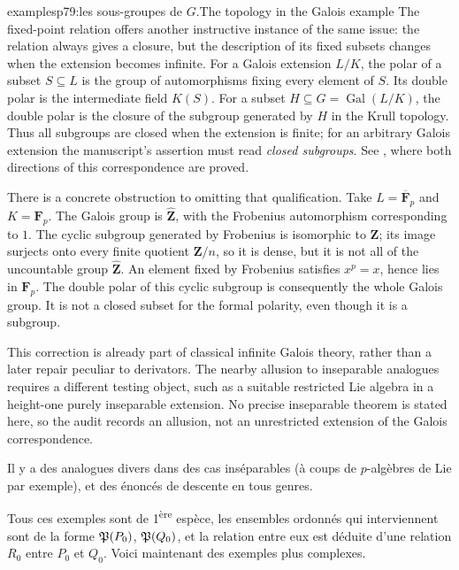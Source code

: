 \begin{dcomment}{examples}{p79:les sous-groupes de $G$.}{The topology in the Galois example}
The fixed-point relation offers another instructive instance of the same issue: the relation always gives a closure, but the description of its fixed subsets changes when the extension becomes infinite. For a Galois extension $L/K$, the polar of a subset $S\subseteq L$ is the group of automorphisms fixing every element of $S$. Its double polar is the intermediate field $K(S)$. For a subset $H\subseteq G=\operatorname{Gal}(L/K)$, the double polar is the closure of the subgroup generated by $H$ in the Krull topology. Thus all subgroups are closed when the extension is finite; for an arbitrary Galois extension the manuscript's assertion must read \emph{closed subgroups}. See \citet[Proposition 7.12 and Theorem 7.13]{Milne2022FT}, where both directions of this correspondence are proved.

There is a concrete obstruction to omitting that qualification. Take $L=\overline{\mathbf F}_p$ and $K=\mathbf F_p$. The Galois group is $\widehat{\mathbf Z}$, with the Frobenius automorphism corresponding to $1$. The cyclic subgroup generated by Frobenius is isomorphic to $\mathbf Z$; its image surjects onto every finite quotient $\mathbf Z/n$, so it is dense, but it is not all of the uncountable group $\widehat{\mathbf Z}$. An element fixed by Frobenius satisfies $x^p=x$, hence lies in $\mathbf F_p$. The double polar of this cyclic subgroup is consequently the whole Galois group. It is not a closed subset for the formal polarity, even though it is a subgroup.

This correction is already part of classical infinite Galois theory, rather than a later repair peculiar to derivators. The nearby allusion to inseparable analogues requires a different testing object, such as a suitable restricted Lie algebra in a height-one purely inseparable extension. No precise inseparable theorem is stated here, so the audit records an allusion, not an unrestricted extension of the Galois correspondence.
\end{dcomment}


Il y a des analogues divers dans des cas inséparables (à coups de $p$-algèbres de Lie par exemple), et des énoncés de descente en tous genres.

Tous ces exemples sont de 1\textsuperscript{ère} espèce, les ensembles ordonnés qui interviennent sont de la forme $\mathfrak{P}(P_0)$, $\mathfrak{P}(Q_0)$, et la relation entre eux est déduite d'une relation $R_0$ entre $P_0$ et $Q_0$. Voici maintenant des exemples plus complexes.

